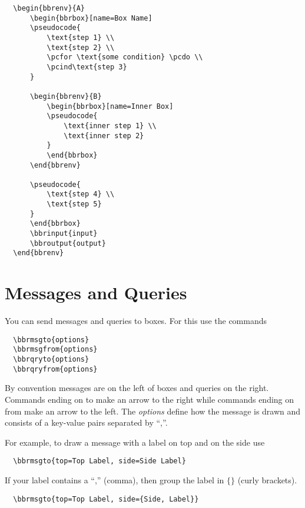 \documentclass[a4paper]{report}
\begin{document}
  \begin{lstlisting}
  \begin{bbrenv}{A}
	  \begin{bbrbox}[name=Box Name]
	  \pseudocode{
		  \text{step 1} \\
		  \text{step 2} \\
		  \pcfor \text{some condition} \pcdo \\
		  \pcind\text{step 3} 
	  }
  
	  \begin{bbrenv}{B}
		  \begin{bbrbox}[name=Inner Box]
		  \pseudocode{
			  \text{inner step 1} \\
			  \text{inner step 2} 
		  }
		  \end{bbrbox}
	  \end{bbrenv}
  
	  \pseudocode{
		  \text{step 4} \\
		  \text{step 5} 
	  }
	  \end{bbrbox}
	  \bbrinput{input}
	  \bbroutput{output}
  \end{bbrenv}
  \end{lstlisting}
  
  \section{Messages and Queries}
  
  You can send messages and queries to boxes. For this use the commands 
  \begin{lstlisting}
  \bbrmsgto{options}
  \bbrmsgfrom{options}
  \bbrqryto{options}
  \bbrqryfrom{options}
  \end{lstlisting}
  By convention messages are on the left of boxes and queries on the right. Commands ending on to
  make an arrow to the right while commands ending on from make an arrow to the left. The \emph{options}
  define how the message is drawn and consists of a key-value pairs separated by \enquote{,}.
  
  For example, to draw a message with a label on top and on the side use
  \begin{lstlisting}
  \bbrmsgto{top=Top Label, side=Side Label}
  \end{lstlisting}
  If your label contains a \enquote{,} (comma), then group the label in $\{\}$ (curly brackets).
  \begin{lstlisting}
  \bbrmsgto{top=Top Label, side={Side, Label}}
  \end{lstlisting}
  
\end{document}
